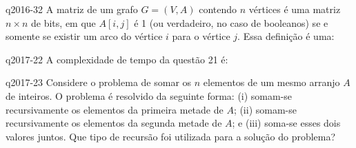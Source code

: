\documentclass[10pt,a4paper]{article}
\begin{document}
{
\def\AMCbeginQuestion#1#2{\par\noindent{\bf (POSCOMP 2016 - Questão 32)}}
\begin{question}{q2016-32} A matriz de um grafo $G = (V,A)$ contendo $n$ vértices é uma matriz $n \times n$ de bits, em que $A[i,j]$ é 1 (ou verdadeiro, no caso de booleanos) se e somente se existir um arco do vértice $i$ para o vértice $j$. Essa definição é uma:
\begin{choices}
\end{choices}
\end{question}
}

{
\def\AMCbeginQuestion#1#2{\par\noindent{\bf (POSCOMP 2017 - Questão 22)}}
\begin{question}{q2017-22} A complexidade de tempo da questão 21 é:
\begin{choices}
\end{choices}
\end{question}
}

{
\def\AMCbeginQuestion#1#2{\par\noindent{\bf (POSCOMP 2017 - Questão 23)}}
\begin{question}{q2017-23} Considere o problema de somar os $n$ elementos de um mesmo arranjo $A$ de inteiros. O problema é resolvido da seguinte forma: (i) somam-se recursivamente os elementos da primeira metade de $A$; (ii) somam-se recursivamente os elementos da segunda metade de $A$; e (iii) soma-se esses dois valores juntos. Que tipo de recursão foi utilizada para a solução do problema?
\begin{choices}
\end{choices}
\end{question}
}
\end{document}
